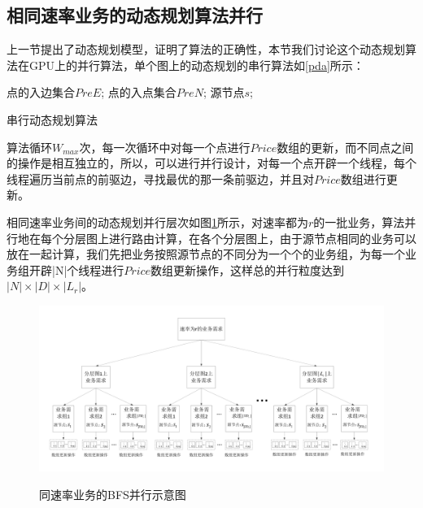 \subsection{相同速率业务的动态规划算法并行}
上一节提出了动态规划模型，证明了算法的正确性，本节我们讨论这个动态规划算法在GPU上的并行算法，单个图上的动态规划的串行算法如\ref{pda}所示：
\begin{algorithm}[t]
\begin{algorithmic}[1]
\Require
点的入边集合$PreE$;
点的入点集合$PreN$;
源节点$s$;
\EndFor
\EndFor
\end{algorithmic}
\caption{{串行动态规划算法}}
\label{pda}
\end{algorithm}

算法循环$W_{max}$次，每一次循环中对每一个点进行$Price$数组的更新，而不同点之间的操作是相互独立的，所以，可以进行并行设计，对每一个点开辟一个线程，每个线程遍历当前点的前驱边，寻找最优的那一条前驱边，并且对$Price$数组进行更新。

相同速率业务间的动态规划并行层次如图\ref{DRK}所示，对速率都为$r$的一批业务，算法并行地在每个分层图上进行路由计算，在各个分层图上，由于源节点相同的业务可以放在一起计算，我们先把业务按照源节点的不同分为一个个的业务组，为每一个业务组开辟|N|个线程进行$Price$数组更新操作，这样总的并行粒度达到$|N|\times|D|\times|L_r|$。
\begin{figure}
\setlength{\belowcaptionskip}{-0.5cm}
\begin{center}
{\includegraphics[width=1 \textwidth]{figures/DRK.pdf}}
\end{center}
\caption{{\footnotesize{同速率业务的BFS并行示意图}}}
\label{DRK}
\end{figure}

